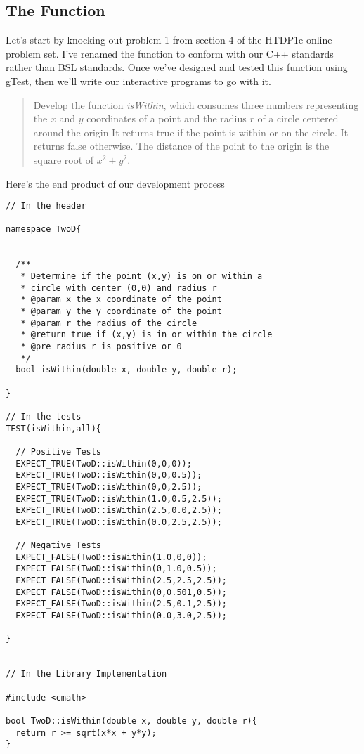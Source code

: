 \documentclass[]{tufte-handout}
\begin{document}
\subsection{The Function}

Let's start by knocking out problem 1 from section 4 of the HTDP1e online problem set. I've renamed the function to conform with our C++ standards rather than BSL standards. Once we've designed and tested this function using gTest, then we'll write our interactive programs to go with it.

\begin{framed}
\begin{quote}
Develop the function \textit{isWithin}, which consumes three numbers representing the $x$ and $y$ coordinates of a point and the radius $r$ of a circle centered around the origin It returns true if the point is within or on the circle. It returns false otherwise. The distance of the point to the origin is the square root of $x^2 + y^2$.
\end{quote}
\end{framed}

Here's the end product of our development process
\begin{verbatim}
// In the header

namespace TwoD{


  /**
   * Determine if the point (x,y) is on or within a
   * circle with center (0,0) and radius r
   * @param x the x coordinate of the point
   * @param y the y coordinate of the point
   * @param r the radius of the circle
   * @return true if (x,y) is in or within the circle
   * @pre radius r is positive or 0
   */
  bool isWithin(double x, double y, double r);

}

// In the tests
TEST(isWithin,all){

  // Positive Tests
  EXPECT_TRUE(TwoD::isWithin(0,0,0));
  EXPECT_TRUE(TwoD::isWithin(0,0,0.5));
  EXPECT_TRUE(TwoD::isWithin(0,0,2.5));
  EXPECT_TRUE(TwoD::isWithin(1.0,0.5,2.5));
  EXPECT_TRUE(TwoD::isWithin(2.5,0.0,2.5));
  EXPECT_TRUE(TwoD::isWithin(0.0,2.5,2.5));

  // Negative Tests
  EXPECT_FALSE(TwoD::isWithin(1.0,0,0));
  EXPECT_FALSE(TwoD::isWithin(0,1.0,0.5));
  EXPECT_FALSE(TwoD::isWithin(2.5,2.5,2.5));
  EXPECT_FALSE(TwoD::isWithin(0,0.501,0.5));
  EXPECT_FALSE(TwoD::isWithin(2.5,0.1,2.5));
  EXPECT_FALSE(TwoD::isWithin(0.0,3.0,2.5));

}


// In the Library Implementation

#include <cmath>

bool TwoD::isWithin(double x, double y, double r){
  return r >= sqrt(x*x + y*y);
}

\end{verbatim}
\end{document}
